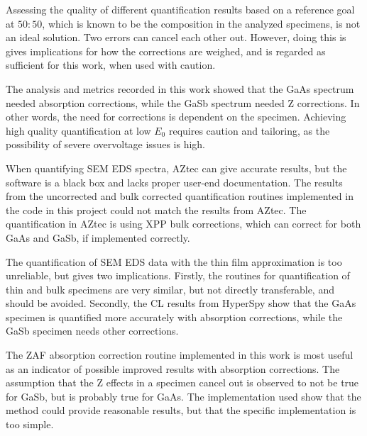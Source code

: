 Assessing the quality of different quantification results based on a reference goal at $50:50$, which is known to be the composition in the analyzed specimens, is not an ideal solution.
Two errors can cancel each other out.
However, doing this is gives implications for how the corrections are weighed, and is regarded as sufficient for this work, when used with caution.

The analysis and metrics recorded in this work showed that the GaAs spectrum needed absorption corrections, while the GaSb spectrum needed Z corrections.
In other words, the need for corrections is dependent on the specimen.
Achieving high quality quantification at low $E_0$ requires caution and tailoring, as the possibility of severe overvoltage issues is high.

When quantifying SEM EDS spectra, AZtec can give accurate results, but the software is a black box and lacks proper user-end documentation.
The results from the uncorrected and bulk corrected quantification routines implemented in the code in this project could not match the results from AZtec.
The quantification in AZtec is using XPP bulk corrections, which can correct for both GaAs and GaSb, if implemented correctly.

The quantification of SEM EDS data with the thin film approximation is too unreliable, but gives two implications.
Firstly, the routines for quantification of thin and bulk specimens are very similar, but not directly transferable, and should be avoided.
Secondly, the CL results from HyperSpy show that the GaAs specimen is quantified more accurately with absorption corrections, while the GaSb specimen needs other corrections.

The ZAF absorption correction routine implemented in this work is most useful as an indicator of possible improved results with absorption corrections.
The assumption that the Z effects in a specimen cancel out is observed to not be true for GaSb, but is probably true for GaAs.
The implementation used show that the method could provide reasonable results, but that the specific implementation is too simple.

